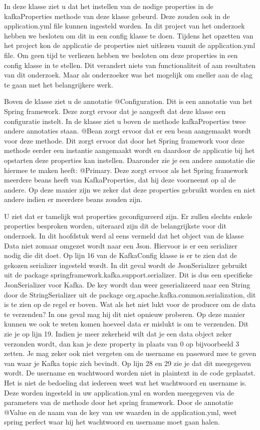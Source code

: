      In deze klasse ziet u dat het instellen van de nodige properties in de kafkaProperties methode van deze klasse gebeurd. Deze zouden ook in de application.yml file kunnen ingesteld worden. In dit project van het onderzoek hebben we besloten om dit in een config klasse te doen. Tijdens het opzetten van het project kon de applicatie de properties niet uitlezen vanuit de application.yml file. Om geen tijd te verliezen hebben we besloten om deze properties in een config klasse in te stellen. Dit verandert niets van functionaliteit of aan resultaten van dit onderzoek. Maar als onderzoeker was het mogelijk om sneller aan de slag te gaan met het belangrijkere werk.
     
     Boven de klasse ziet u de annotatie @Configuration. Dit is een annotatie van het Spring framework. Deze zorgt ervoor dat je aangeeft dat deze klasse een configuratie instelt. In de klasse ziet u boven de methode kafkaProperties twee andere annotaties staan. @Bean zorgt ervoor dat er een bean aangemaakt wordt voor deze methode. Dit zorgt ervoor dat door het Spring framework voor deze methode eerder een instantie aangemaakt wordt en daardoor de applicatie bij het opstarten deze properties kan instellen. Daaronder zie je een andere annotatie die hiermee te maken heeft: @Primary. Deze zorgt ervoor als het Spring framework meerdere beans heeft van KafkaProperties, dat hij deze voorneemt op al de andere. Op deze manier zijn we zeker dat deze properties gebruikt worden en niet andere indien er meerdere beans zouden zijn.
     
     U ziet dat er tamelijk wat properties geconfigureerd zijn. Er zullen slechts enkele properties besproken worden, uiteraard zijn dit de belangrijkste voor dit onderzoek. In dit hoofdstuk werd al eens vermeld dat het object van de klasse Data niet zomaar omgezet wordt naar een Json. Hiervoor is er een serializer nodig die dit doet. Op lijn 16 van de KafkaConfig klasse is er te zien dat de gekozen serializer ingesteld wordt. In dit geval wordt de JsonSerializer gebruikt uit de package springframework.kafka.support.serializer. Dit is dus een specifieke JsonSerializer voor Kafka. De key wordt dan weer geserializeerd naar een String door de StringSerializer uit de package org.apache.kafka.common.serialization, dit is te zien op de regel er boven. Wat als het niet lukt voor de producer om de data te verzenden? In ons geval mag hij dit niet opnieuw proberen. Op deze manier kunnen we ook te weten komen hoeveel data er mislukt is om te verzenden. Dit zie je op lijn 19. Indien je meer zekerheid wilt dat je een data object zeker verzonden wordt, dan kan je deze property in plaats van 0 op bijvoorbeeld 3 zetten. Je mag zeker ook niet vergeten om de username en password mee te geven van waar je Kafka topic zich bevindt. Op lijn 28 en 29 zie je dat dit meegegeven wordt. De username en wachtwoord worden niet in plaintext in de code geplaatst. Het is niet de bedoeling dat iedereen weet wat het wachtwoord en username is. Deze worden ingesteld in uw application.yml en worden meegegeven via de parameters van de methode door het spring framework. Door de annotatie @Value en de naam van de key van uw waarden in de application.yml, weet spring perfect waar hij het wachtwoord en username moet gaan halen.
     
